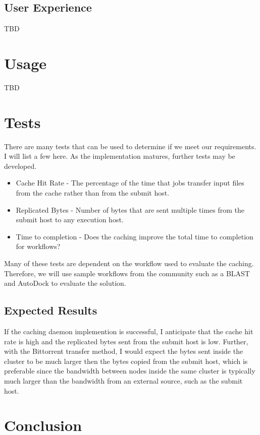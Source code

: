 \subsection{User Experience}
TBD


\section{Usage}
TBD

\section{Tests}

There are many tests that can be used to determine if we meet our requirements.  I will list a few here.  As the implementation matures, further tests may be developed.

\begin{itemize}
\item Cache Hit Rate - The percentage of the time that jobs transfer input files from the cache rather than from the submit host.
\item Replicated Bytes - Number of bytes that are sent multiple times from the submit host to any execution host.
\item Time to completion - Does the caching improve the total time to completion for workflows?

\end{itemize}

Many of these tests are dependent on the workflow used to evaluate the caching.  Therefore, we will use sample workflows from the community such as a BLAST and AutoDock to evaluate the solution.

\subsection{Expected Results}

If the caching daemon implemention is successful, I anticipate that the cache hit rate is high and the replicated bytes sent from the submit host is low.  Further, with the Bittorrent transfer method, I would expect the bytes sent inside the cluster to be much larger then the bytes copied from the submit host, which is preferable since the bandwidth between nodes inside the same cluster is typically much larger than the bandwidth from an external source, such as the submit host.

\section{Conclusion}




